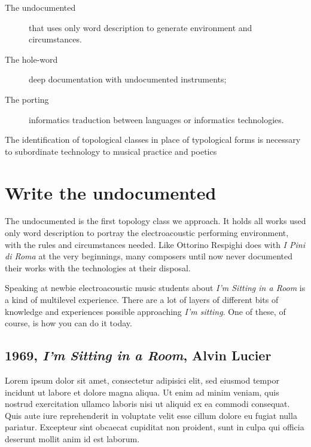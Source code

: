 \documentclass[twoside,a4paper]{article}
\begin{document}
\begin{description}
  \item[The undocumented] that uses only word description to generate environment and circumstances.
  \item[The hole-word] deep documentation with undocumented instruments;
  \item[The porting] informatics traduction between languages or informatics technologies.
\end{description}

The identification of topological classes in place of typological forms is necessary to subordinate technology to musical practice and poetics


\section{Write the undocumented}
\label{sec:writing}

The undocumented is the first topology class we approach. It holds all works used only word description to portray the electroacoustic performing environment, with the rules and circumstances needed. Like Ottorino Respighi does with \emph{I Pini di Roma} at the very beginnings, many composers until now never documented their works with the technologies at their disposal. 

Speaking at newbie electroacoustic music students about \emph{I'm Sitting in a Room} is a kind of multilevel experience. There are a lot of layers of different bits of knowledge and experiences possible approaching \emph{I'm sitting}. One of these, of course, is how you can do it today. 

\subsection{1969, \emph{I'm Sitting in a Room}, Alvin Lucier}

Lorem ipsum dolor sit amet, consectetur adipisici elit, sed eiusmod tempor
incidunt ut labore et dolore magna aliqua. Ut enim ad minim veniam, quis
nostrud exercitation ullamco laboris nisi ut aliquid ex ea commodi consequat.
Quis aute iure reprehenderit in voluptate velit esse cillum dolore eu fugiat
nulla pariatur. Excepteur sint obcaecat cupiditat non proident, sunt in culpa
qui officia deserunt mollit anim id est laborum.
\end{document}
